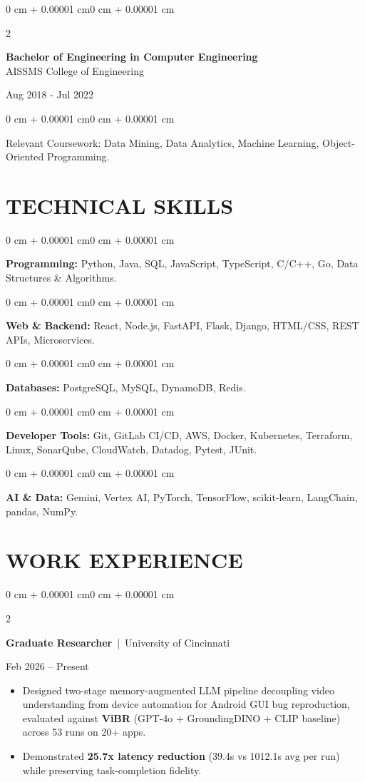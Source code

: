 \documentclass[10pt, letterpaper]{article}
\newenvironment{highlights}{
    \begin{itemize}[
        topsep=0.10 cm,
        parsep=0.06 cm,
        partopsep=0pt,
        itemsep=0.06 cm,
        leftmargin=12pt
    ]
}{
    \end{itemize}
}
\newenvironment{onecolentry}{
    \begin{adjustwidth}{0 cm + 0.00001 cm}{0 cm + 0.00001 cm}
}{
    \end{adjustwidth}
}
\newenvironment{twocolentry}[2][]{
    \onecolentry
    \def\secondColumn{#2}
    \setcolumnwidth{\fill, 4.5 cm}
    \begin{paracol}{2}
}{
    \switchcolumn \raggedleft \secondColumn
    \end{paracol}
    \endonecolentry
}
\begin{document}
\begin{twocolentry}{
    Aug 2018 - Jul 2022
}
    \textbf{Bachelor of Engineering in Computer Engineering} \\
    AISSMS College of Engineering
\end{twocolentry}
\begin{onecolentry}
Relevant Coursework: Data Mining, Data Analytics, Machine Learning, Object-Oriented Programming.
\end{onecolentry}
\section{TECHNICAL SKILLS}
\begin{onecolentry}
\textbf{Programming:} Python, Java, SQL, JavaScript, TypeScript, C/C++, Go, Data Structures \& Algorithms.
\end{onecolentry}
\vspace{0.06 cm}
\begin{onecolentry}
\textbf{Web \& Backend:} React, Node.js, FastAPI, Flask, Django, HTML/CSS, REST APIs, Microservices.
\end{onecolentry}
\vspace{0.06 cm}
\begin{onecolentry}
\textbf{Databases:} PostgreSQL, MySQL, DynamoDB, Redis.
\end{onecolentry}
\vspace{0.06 cm}
\begin{onecolentry}
\textbf{Developer Tools:} Git, GitLab CI/CD, AWS, Docker, Kubernetes, Terraform, Linux, SonarQube, CloudWatch, Datadog, Pytest, JUnit.
\end{onecolentry}
\vspace{0.06 cm}
\begin{onecolentry}
\textbf{AI \& Data:} Gemini, Vertex AI, PyTorch, TensorFlow, scikit-learn, LangChain, pandas, NumPy.
\end{onecolentry}

\section{WORK EXPERIENCE}
\begin{twocolentry}{Feb 2026 -- Present}
\textbf{Graduate Researcher} \,|\, University of Cincinnati
\end{twocolentry}
\begin{highlights}
  \item Designed two-stage memory-augmented LLM pipeline decoupling video understanding from device automation for Android GUI bug reproduction, evaluated against \textbf{ViBR} (GPT-4o + GroundingDINO + CLIP baseline) across 53 runs on 20+ apps.
  \item Demonstrated \textbf{25.7x latency reduction} (39.4s vs 1012.1s avg per run) while preserving task-completion fidelity.
\end{highlights}
\end{document}
